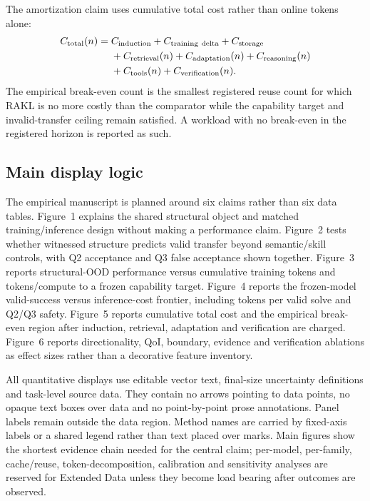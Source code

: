 The amortization claim uses cumulative total cost rather than online tokens alone:
\[
\begin{aligned}
C_{\rm total}(n)={}&C_{\rm induction}+C_{\rm training\ delta}+C_{\rm storage}\\
&+C_{\rm retrieval}(n)+C_{\rm adaptation}(n)+C_{\rm reasoning}(n)\\
&+C_{\rm tools}(n)+C_{\rm verification}(n).
\end{aligned}
\]
The empirical break-even count is the smallest registered reuse count for which RAKL is no more costly than the comparator while the capability target and invalid-transfer ceiling remain satisfied. A workload with no break-even in the registered horizon is reported as such.

\subsection{Main display logic}

The empirical manuscript is planned around six claims rather than six data tables. Figure~1 explains the shared structural object and matched training/inference design without making a performance claim. Figure~2 tests whether witnessed structure predicts valid transfer beyond semantic/skill controls, with Q2 acceptance and Q3 false acceptance shown together. Figure~3 reports structural-OOD performance versus cumulative training tokens and tokens/compute to a frozen capability target. Figure~4 reports the frozen-model valid-success versus inference-cost frontier, including tokens per valid solve and Q2/Q3 safety. Figure~5 reports cumulative total cost and the empirical break-even region after induction, retrieval, adaptation and verification are charged. Figure~6 reports directionality, QoI, boundary, evidence and verification ablations as effect sizes rather than a decorative feature inventory.

All quantitative displays use editable vector text, final-size uncertainty definitions and task-level source data. They contain no arrows pointing to data points, no opaque text boxes over data and no point-by-point prose annotations. Panel labels remain outside the data region. Method names are carried by fixed-axis labels or a shared legend rather than text placed over marks. Main figures show the shortest evidence chain needed for the central claim; per-model, per-family, cache/reuse, token-decomposition, calibration and sensitivity analyses are reserved for Extended Data unless they become load bearing after outcomes are observed.

